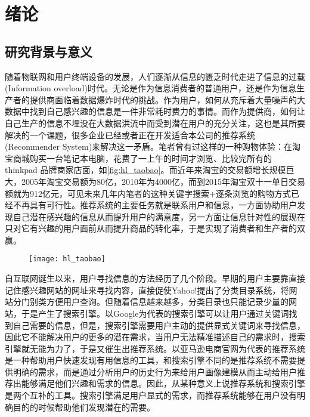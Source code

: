 ﻿
\chapter{绪论}
	\label{chap:introduction}
	\section{研究背景与意义}
	随着物联网和用户终端设备的发展，人们逐渐从信息的匮乏时代走进了信息的过载(Information overload)时代。无论是作为信息消费者的普通用户，还是作为信息生产者的提供商面临着数据爆炸时代的挑战。作为用户，如何从充斥着大量噪声的大数据中找到自己感兴趣的信息是一件非常耗时费力的事情。而作为提供商，如何让自己生产的信息不埋没在大数据洪流中而受到潜在用户的充分关注，这也是其所要解决的一个课题，很多企业已经或者正在开发适合本公司的推荐系统(Recommender System)来解决这一矛盾。笔者曾有过这样的一种购物体验：在淘宝商城购买一台笔记本电脑，花费了一上午的时间才浏览、比较完所有的 thinkpad 品牌商家店面，如\autoref{fig:hl_taobao}。而近年来淘宝的交易额增长规模巨大，2005年淘宝交易额为80亿，2010年为4000亿，而到2015年淘宝双十一单日交易额就为912亿元，可见未来几年内笔者的这种关键字搜索+逐条浏览的购物方式已经不再具有可行性。推荐系统的主要任务就是联系用户和信息，一方面协助用户发现自己潜在感兴趣的信息从而提升用户的满意度，另一方面让信息针对性的展现在只对它有兴趣的用户面前从而提升商品的转化率，于是实现了消费者和生产者的双赢。
	\begin{figure}
		\centering
		\texttt{[image: hl\_taobao]}
		\label{fig:hl_taobao}
	\end{figure}

	自互联网诞生以来，用户寻找信息的方法经历了几个阶段。早期的用户主要靠直接记住感兴趣网站的网址来寻找内容，直接促使Yahoo!提出了分类目录系统，将网站分门别类方便用户查询。但随着信息越来越多，分类目录也只能记录少量的网站，于是产生了搜索引擎。以Google为代表的搜索引擎可以让用户通过关键词找到自己需要的信息，但是，搜索引擎需要用户主动的提供显式关键词来寻找信息，因此它不能解决用户的更多的潜在需求，当用户无法精准描述自己的需求时，搜索引擎就无能为力了，于是又催生出推荐系统\citep{recmd-system}。以亚马逊电商官网为代表的推荐系统是一种帮助用户快速发现有用信息的工具，和搜索引擎不同的是推荐系统不需要提供明确的需求，而是通过分析用户的历史行为来给用户画像建模从而主动给用户推荐出能够满足他们兴趣和需求的信息。因此，从某种意义上说推荐系统和搜索引擎是两个互补的工具。搜索引擎满足用户显式的需求，而推荐系统能够在用户没有明确目的的时候帮助他们发现潜在的需要。

